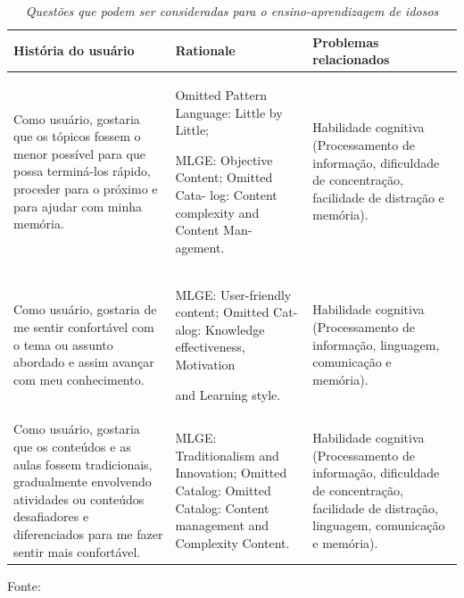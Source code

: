 \begin{table}[!ht]
\centering
\caption{\textit{Questões que podem ser consideradas para o ensino-aprendizagem de idosos}}
\centering
\footnotesize
\begin{tabular}{p{5cm} p{5cm} p{5cm}}
\toprule
\textbf{História do usuário} & \textbf{Rationale} & \textbf{Problemas relacionados}                                   
\\ \midrule
Como usuário, gostaria que os tópicos fossem o menor possível para que possa terminá-los rápido, proceder para o próximo e para ajudar com minha memória.
& 
Omitted Pattern Language: Little by Little;

MLGE: Objective Content; Omitted Cata-
log: Content complexity and Content Man-
agement.
&
Habilidade cognitiva (Processamento de informação, dificuldade de concentração, facilidade de distração e memória).
\\ \midrule
Como usuário, gostaria de me sentir confortável com o tema ou assunto abordado e assim avançar com meu conhecimento.
& 
MLGE: User-friendly content; Omitted Cat-
alog: Knowledge effectiveness, Motivation

and Learning style.
&
Habilidade cognitiva (Processamento de informação, linguagem, comunicação e memória).
\\ \midrule
Como usuário, gostaria que os conteúdos e as aulas fossem tradicionais, gradualmente envolvendo atividades ou conteúdos desafiadores e diferenciados para me fazer sentir mais confortável.
& 
MLGE: Traditionalism and Innovation;
Omitted Catalog: Omitted Catalog: Content
management and Complexity Content.
&
Habilidade cognitiva (Processamento de informação, dificuldade de concentração, facilidade de distração, linguagem, comunicação e memória).
\\ \midrule

\end{tabular}
\label{tab:questoesAprIdosos}

Fonte: \cite{zemke198430}
\end{table}





